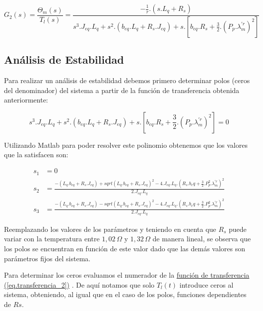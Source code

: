 \documentclass{article}
\begin{document}
\begin{equation}\label{eq.transferencia_2}
    G_{2}(s) = \frac{\Theta_{m}(s)}{T_{l}(s)} = \frac{- \frac{1}{r}.(s.L_{q}+R_{s})}{s^3.J_{eq}.L_{q} + s^2.(b_{eq}.L_{q} +  R_{s}.J_{eq}) + s.[b_{eq}.R_{s}+\frac{3}{2}.(P_{p}.\lambda_{m}^{\prime r})^2]}
\end{equation}


\subsection{Análisis de Estabilidad}

Para realizar un análisis de estabilidad debemos primero determinar polos (ceros del denominador) del 
sistema a partir de la función de transferencia obtenida anteriormente:

\begin{equation}
    s^3.J_{eq}.L_{q} + s^2.(b_{eq}.L_{q} +  R_{s}.J_{eq}) + s.[b_{eq}.R_{s}+\frac{3}{2}.(P_{p}.\lambda_{m}^{\prime r})^2] = 0
\end{equation}

Utilizando Matlab para poder resolver este polinomio obtenemos que los valores que la satisfacen son:

\begin{align*}
    s_{1} &= 0\\
    s_{2} &= \frac{-(L_q.b_{eq} + R_s.J_{eq}) + sqrt{(L_q.b_{eq} + R_s.J_{eq})^2 - 4.J_{eq}.L_q.(R_s.b_eq + \frac{3}{2}.P_p^2.\lambda_{m}^{\prime r})^2}}{2.J_{eq}.L_q}\\
    s_{3} &= \frac{-(L_q.b_{eq} + R_s.J_{eq}) - sqrt{(L_q.b_{eq} + R_s.J_{eq})^2 - 4.J_{eq}.L_q.(R_s.b_eq + \frac{3}{2}.P_p^2.\lambda_{m}^{\prime r})^2}}{2.J_{eq}.L_q}
\end{align*}

Reemplazando los valores de los parámetros y teniendo en cuenta que $R_s$ puede variar con la temperatura entre 
$1,02\, \Omega$ y $1,32\, \Omega$ de manera lineal, se observa que los polos se encuentran en 
función de este valor dado que las demás valores son parámetros fijos del sistema.

Para determinar los ceros evaluamos  el numerador de la
\hyperref[eq.transferencia_2]{función de transferencia (\ref*{eq.transferencia_2})}
. De aquí notamos que solo $T_l(t)$ introduce ceros al sistema, obteniendo, al igual que en el caso 
de los polos, funciones dependientes de $Rs$.
\end{document}

